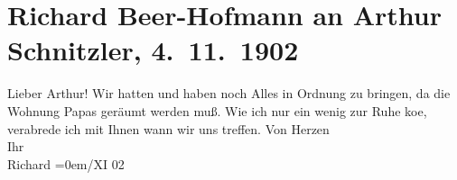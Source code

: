 

         
         \renewcommand{\erwaehntePersonen}{Personen: Hermann Beer, Richard Beer-Hofmann}
         \renewcommand{\erwaehnteOrte}{Orte: Rodaun, Wien}
         \renewcommand{\erwaehnteWerke}{}
               \section[Richard Beer-Hofmann an Arthur Schnitzler, 4. 11. 1902]{ Richard Beer-Hofmann an Arthur Schnitzler, 4. 11. 1902}\nopagebreak{}\rehead{ }\begin{ledgroupsized}[t]{13cm}\normalsize\beginnumbering{} \toendnotes[C]{\smallbreak\pagebreak[2]} 
\toendnotes[C]{\smallbreak}\pstart
           \noindent{}{\pb}Lieber Arthur! Wir hatten und haben noch Alles in Ordnung zu
               bringen, da die Wohnung Papas geräumt werden muß. Wie ich nur ein wenig zur Ruhe ko{\geminationm}e, verabrede ich mit Ihnen wann wir uns treffen.\pend
           \pstart
           Von Herzen{\\[\baselineskip]}Ihr{\\[\baselineskip]}\spacefill\mbox{Richard}\pend
           \leftskip=0em{}/XI 02\pend
           
         
         \endnumbering{}\end{ledgroupsized}  \newcommand{\dateiname}{L01247}\newcommand{\titel}{Richard Beer-Hofmann an Arthur Schnitzler, 4. 11. 1902}\newcommand{\editorInnen}{Martin Anton Müller und Gerd-Hermann Susen}
      